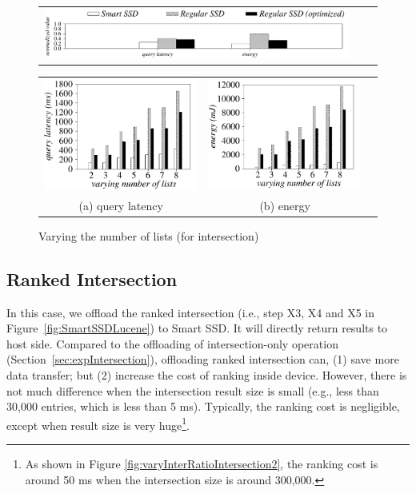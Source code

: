   \begin{figure}[tbp]
  \centering
    \begin{tabular}{ccc}
 \includegraphics[width=0.95\columnwidth]{figures/banner.pdf}
\end{tabular}
\renewcommand{\tabcolsep}{0.1mm}
  \begin{tabular}{ccc}
 \includegraphics[width=0.5\columnwidth]{figures/Intersection-time-VaryNumLists-eps-converted-to.pdf}&
  \includegraphics[width=0.5\columnwidth]{figures/Intersection-energy-VaryNumLists-eps-converted-to.pdf}\\
  (a) query latency & (b) energy
\end{tabular}
  \caption{Varying the number of lists (for intersection)}
  \label{fig:varyNumKeywordsIntersection}
 \end{figure}


\subsection{Ranked Intersection}\label{sec:expRankedIntersection}
In this case, we offload the \textsf{ranked intersection} (i.e., step X3, X4 and X5 in Figure~\ref{fig:SmartSSDLucene}) to Smart SSD. It will directly return results to host side. Compared to the offloading of intersection-only operation (Section~\ref{sec:expIntersection}), offloading ranked intersection can, (1) save more data transfer; but (2) increase the cost of ranking inside device. However, there is not much difference when the intersection result size is small (e.g., less than 30,000 entries, which is less than 5 ms).
Typically, the ranking cost is negligible, except when result size is very huge\footnote{As shown in Figure \protect\ref{fig:varyInterRatioIntersection2}, the ranking cost is around 50 ms when the intersection size is around 300,000.}.


